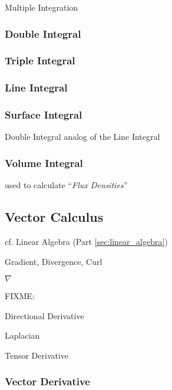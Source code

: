Multiple Integration



\subsubsection{Double Integral}\label{sec:double_integral}

\subsubsection{Triple Integral}\label{sec:triple_integral}

\subsubsection{Line Integral}\label{sec:line_integral}

\subsubsection{Surface Integral}\label{sec:surface_integral}

Double Integral analog of the Line Integral



\subsubsection{Volume Integral}\label{sec:volume_integral}

used to calculate ``\emph{Flux Densities}'' %



\subsection{Vector Calculus}\label{sec:vector_calclulus}

cf. Linear Algebra (Part \ref{sec:linear_algebra})

Gradient, Divergence, Curl

$\nabla$

FIXME:

Directional Derivative

Laplacian

Tensor Derivative



\subsubsection{Vector Derivative}\label{sec:vector_derivative}

